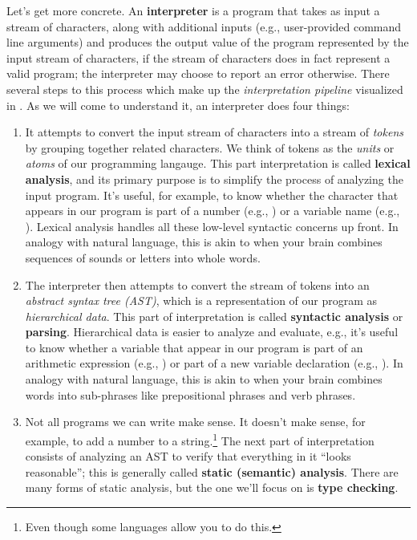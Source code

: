 Let's get more concrete.
An \textbf{interpreter} is a program that takes as input a stream of characters, along with additional inputs (e.g., user-provided command line arguments) and produces the output value of the program represented by the input stream of characters, if the stream of characters does in fact represent a valid program; the interpreter may choose to report an error otherwise.
There several steps to this process which make up the \textit{interpretation pipeline} visualized in .
As we will come to understand it, an interpreter does four things:
\begin{enumerate}
\item
  It attempts to convert the input stream of characters into a stream of \textit{tokens} by grouping together related characters.
  We think of tokens as the \textit{units} or \textit{atoms} of our programming langauge.
  This part interpretation is called \textbf{lexical analysis}, and its primary purpose is to simplify the process of analyzing the input program.
  It's useful, for example, to know whether the character  that appears in our program is part of a number (e.g., ) or a variable name (e.g., ).
  Lexical analysis handles all these low-level syntactic concerns up front.
  In analogy with natural language, this is akin to when your brain combines sequences of sounds or letters into whole words.
\item
  The interpreter then attempts to convert the stream of tokens into an \textit{abstract syntax tree (AST)}, which is a representation of our program as \textit{hierarchical data}.
  This part of interpretation is called \textbf{syntactic analysis} or \textbf{parsing}.
  Hierarchical data is easier to analyze and evaluate, e.g., it's useful to know whether a variable  that appear in our program is part of an arithmetic expression (e.g., ) or part of a new variable declaration (e.g., ).
  In analogy with natural language, this is akin to when your brain combines words into sub-phrases like prepositional phrases and verb phrases.
\item
  Not all programs we can write make sense.
  It doesn't make sense, for example, to add a number to a string.\footnote{Even though some languages allow you to do this.}
  The next part of interpretation consists of analyzing an AST to verify that everything in it \enquote{looks reasonable}; this is generally called \textbf{static (semantic) analysis}.
  There are many forms of static analysis, but the one we'll focus on is \textbf{type checking}.

\end{enumerate}
